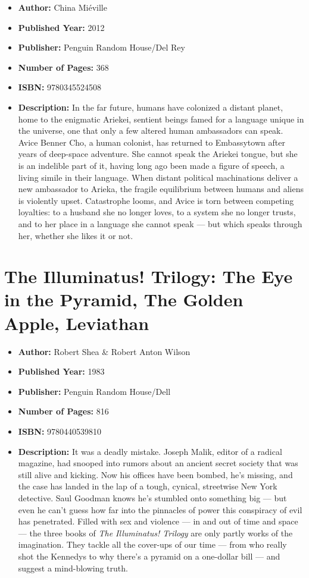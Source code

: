 \documentclass{tufte-handout}
\begin{document}
\begin{itemize}
    \item[] \textbf{Author:} China Miéville
    \item[] \textbf{Published Year:} 2012
    \item[] \textbf{Publisher:} Penguin Random House/Del Rey
    \item[] \textbf{Number of Pages:} 368      
    \item[] \textbf{ISBN:} 9780345524508
    \item[] \textbf{Description:} In the far future, humans have colonized a distant planet, home to the enigmatic Ariekei, sentient beings famed for a language unique in the universe, one that only a few altered human ambassadors can speak. Avice Benner Cho, a human colonist, has returned to Embassytown after years of deep-space adventure. She cannot speak the Ariekei tongue, but she is an indelible part of it, having long ago been made a figure of speech, a living simile in their language. When distant political machinations deliver a new ambassador to Arieka, the fragile equilibrium between humans and aliens is violently upset. Catastrophe looms, and Avice is torn between competing loyalties: to a husband she no longer loves, to a system she no longer trusts, and to her place in a language she cannot speak --- but which speaks through her, whether she likes it or not.

\end{itemize}

\section*{The Illuminatus! Trilogy: The Eye in the Pyramid, The Golden \newline Apple, Leviathan}

\begin{itemize}
    \item[] \textbf{Author:} Robert Shea \& Robert Anton Wilson
    \item[] \textbf{Published Year:} 1983
    \item[] \textbf{Publisher:} Penguin Random House/Dell
    \item[] \textbf{Number of Pages:} 816      
    \item[] \textbf{ISBN:} 9780440539810
    \item[] \textbf{Description:} It was a deadly mistake. Joseph Malik, editor of a radical magazine, had snooped into rumors about an ancient secret society that was still alive and kicking. Now his offices have been bombed, he's missing, and the case has landed in the lap of a tough, cynical, streetwise New York detective. Saul Goodman knows he's stumbled onto something big --- but even he can't guess how far into the pinnacles of power this conspiracy of evil has penetrated. Filled with sex and violence --- in and out of time and space --- the three books of \textit{The Illuminatus! Trilogy} are only partly works of the imagination. They tackle all the cover-ups of our time --- from who really shot the Kennedys to why there's a pyramid on a one-dollar bill --- and suggest a mind-blowing truth.
\end{itemize}
\end{document}
